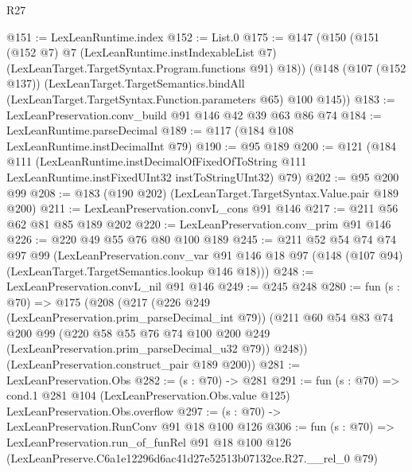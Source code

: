\begin{lexlean}{R27}
\begin{coremodule}
@151 := LexLeanRuntime.index
@152 := List.{0}
@175 := @147
    (@150
      (@151
        (@152 @7)
        @7
        (LexLeanRuntime.instIndexableList @7)
        (LexLeanTarget.TargetSyntax.Program.functions @91)
        @18))
    (@148
      (@107 (@152 @137))
      (LexLeanTarget.TargetSemantics.bindAll
        (LexLeanTarget.TargetSyntax.Function.parameters @65)
        @100
        @145))
@183 := LexLeanPreservation.conv_build @91 @146 @42 @39 @63 @86 @74
@184 := LexLeanRuntime.parseDecimal
@189 := @117 (@184 @108 LexLeanRuntime.instDecimalInt @79)
@190 := @95 @189
@200 := @121
    (@184
      @111
      (LexLeanRuntime.instDecimalOfFixedOfToString
        @111
        LexLeanRuntime.instFixedUInt32
        instToStringUInt32)
      @79)
@202 := @95 @200 @99
@208 := @183 (@190 @202) (LexLeanTarget.TargetSyntax.Value.pair @189 @200)
@211 := LexLeanPreservation.convL_cons @91 @146
@217 := @211 @56 @62 @81 @85 @189 @202
@220 := LexLeanPreservation.conv_prim @91 @146
@226 := @220 @49 @55 @76 @80 @100 @189
@245 := @211
    @52
    @54
    @74
    @74
    @97
    @99
    (LexLeanPreservation.conv_var
      @91
      @146
      @18
      @97
      (@148 (@107 @94) (LexLeanTarget.TargetSemantics.lookup @146 @18)))
@248 := LexLeanPreservation.convL_nil @91 @146
@249 := @245 @248
@280 := fun (s : @70) =>
  @175
    (@208
      (@217
        (@226 @249 (LexLeanPreservation.prim_parseDecimal_int @79))
        (@211
          @60
          @54
          @83
          @74
          @200
          @99
          (@220 @58 @55 @76 @74 @100 @200 @249 (LexLeanPreservation.prim_parseDecimal_u32 @79))
          @248))
      (LexLeanPreservation.construct_pair @189 @200))
@281 := LexLeanPreservation.Obs
@282 := (s : @70) -> @281
@291 := fun (s : @70) =>
  cond.{1} @281 @104 (LexLeanPreservation.Obs.value @125) LexLeanPreservation.Obs.overflow
@297 := (s : @70) -> LexLeanPreservation.RunConv @91 @18 @100 @126
@306 := fun (s : @70) =>
  LexLeanPreservation.run_of_funRel
    @91
    @18
    @100
    @126
    (LexLeanPreserve.C6a1e12296d6ac41d27e52513b07132ce.R27.__rel_0 @79)
\end{coremodule}
\end{lexlean}
